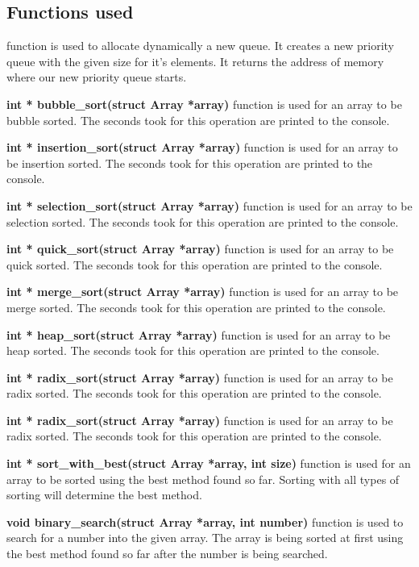 \documentclass{article}
\begin{document}
\subsection{Functions used}
\textbf{}
 function is used to allocate dynamically a new queue. It creates a new priority queue with the given size for it's elements. It returns the address of memory where our new priority queue starts.

{\bf int * bubble\_sort(struct Array *array)} function is used for an array to be bubble sorted. The seconds took for this operation are printed to the console.

{\bf int * insertion\_sort(struct Array *array)} function is used for an array to be insertion sorted. The seconds took for this operation are printed to the console.

{\bf int * selection\_sort(struct Array *array)} function is used for an array to be selection sorted. The seconds took for this operation are printed to the console.

{\bf int * quick\_sort(struct Array *array)} function is used for an array to be quick sorted. The seconds took for this operation are printed to the console.

{\bf int * merge\_sort(struct Array *array)} function is used for an array to be merge sorted. The seconds took for this operation are printed to the console.

{\bf int * heap\_sort(struct Array *array)} function is used for an array to be heap sorted. The seconds took for this operation are printed to the console.

{\bf int * radix\_sort(struct Array *array)} function is used for an array to be radix sorted. The seconds took for this operation are printed to the console.

{\bf int * radix\_sort(struct Array *array)} function is used for an array to be radix sorted. The seconds took for this operation are printed to the console.


{\bf int * sort\_with\_best(struct Array *array, int size)} function is used for an array to be sorted using the best method found so far. Sorting with all types of sorting will determine the best method. 

{\bf void binary\_search(struct Array *array, int number)} function is used to search for a number into the given array. The array is being sorted at first using the best method found so far after the number is being searched. 
\end{document}
